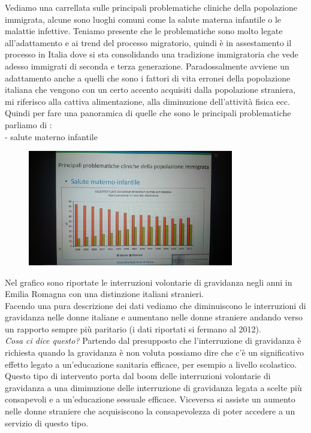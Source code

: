 Vediamo una carrellata sulle principali problematiche cliniche della
popolazione immigrata, alcune sono luoghi comuni come la salute materna
infantile o le malattie infettive. Teniamo presente che le problematiche
sono molto legate all'adattamento e ai trend del processo migratorio,
quindi è in assestamento il processo in Italia dove si sta consolidando
una tradizione immigratoria che vede adesso immigrati di seconda e terza
generazione. Paradossalmente avviene un adattamento anche a quelli che
sono i fattori di vita erronei della popolazione italiana che vengono
con un certo accento acquisiti dalla popolazione straniera, mi riferisco
alla cattiva alimentazione, alla diminuzione dell'attività fisica ecc.\\
Quindi per fare una panoramica di quelle che sono le principali
problematiche parliamo di :\\
- salute materno infantile

\begin{figure}[!ht]
\centering
	\includegraphics[width=0.8\textwidth]{27/image3.jpeg}
	\end{figure}

Nel grafico sono riportate le interruzioni volontarie di gravidanza
negli anni in Emilia Romagna con una distinzione italiani stranieri.\\
Facendo una pura descrizione dei dati vediamo che diminuiscono le
interruzioni di gravidanza nelle donne italiane e aumentano nelle donne
straniere andando verso un rapporto sempre più paritario (i dati
riportati si fermano al 2012).\\
\emph{Cosa ci dice questo?} Partendo dal presupposto che l'interruzione
di gravidanza è richiesta quando la gravidanza è non voluta possiamo
dire che c'è un significativo effetto legato a un'educazione sanitaria
efficace, per esempio a livello scolastico. Questo tipo di intervento
porta dal boom delle interruzioni volontarie di gravidanza a una
diminuzione delle interruzione di gravidanza legata a scelte più
consapevoli e a un'educazione sessuale efficace. Viceversa si assiste un
aumento nelle donne straniere che acquisiscono la consapevolezza di
poter accedere a un servizio di questo tipo.

